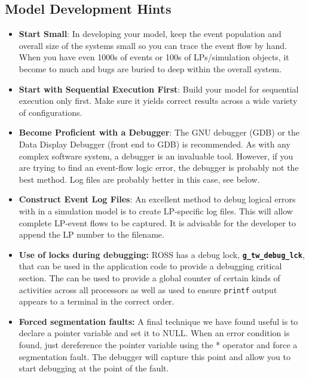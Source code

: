 \documentclass[12pt]{article}
\begin{document}
\subsection{Model Development Hints}

\begin{itemize}
\item {\bf Start Small}: In developing your model, keep the event
population and overall size of the systems small so you can trace
the event flow by hand. When you have even 1000s of events or
100s of LPs/simulation objects, it become to much and bugs are
buried to deep within the overall system.

\item {\bf Start with Sequential Execution First}: Build your
model for sequential execution only first. Make sure it yields
correct results across a wide variety of configurations.

\item {\bf Become Proficient with a Debugger}: The GNU debugger
(GDB) or the Data Display Debugger (front end to GDB) is recommended.
As with any complex software system, a debugger is an invaluable
tool. However, if you are trying to find an event-flow logic error,
the debugger is probably not the best method. Log files are probably
better in this case, see below.

\item {\bf Construct Event Log Files}: An excellent method to debug
logical errors with in a simulation model is to create LP-specific log
files. This will allow complete LP-event flows to be captured. It is
advisable for the developer to append the LP number to the filename.

\item {\bf Use of locks during debugging:} ROSS has a debug lock,
{\tt\bf g\_tw\_debug\_lck}, that can be used in the application code
to provide a debugging critical section. The can be used to provide
a global counter of certain kinds of activities across all processors
as well as used to ensure {\tt printf} output appears to a terminal
in the correct order.

\item {\bf Forced segmentation faults:} A final technique we have
found useful is to declare a pointer variable and set it to NULL.
When an error condition is found, just dereference the pointer
variable using the * operator and force a segmentation fault.  The
debugger will capture this point and allow you to start debugging at
the point of the fault.
\end{itemize}
\end{document}
